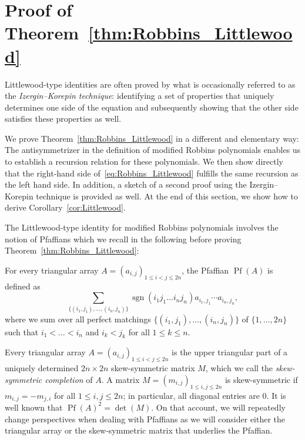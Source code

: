\documentclass[ALCO, Unicode]{cedram}
\DeclareMathOperator{\sgn}{sgn}
\DeclareMathOperator*{\pf}{Pf}
\begin{document}
	
	\section{Proof of Theorem~\ref{thm:Robbins_Littlewood}}
	\label{sec:mainproof}
	
	Littlewood-type identities are often proved by what is occasionally referred to as the \emph{Izergin--Korepin technique}: identifying a set of properties that uniquely determines one side of the equation and subsequently showing that the other side satisfies these properties as well.
	
	We prove Theorem~\ref{thm:Robbins_Littlewood} in a different and elementary way:  The antisymmetrizer in the definition of modified Robbins polynomials enables us to establish a recursion relation for these polynomials. We then show directly that the right-hand side of~\eqref{eq:Robbins_Littlewood} fulfills the same recursion as the left hand side. In addition, a sketch of a second proof using the Izergin--Korepin technique is provided as well. At the end of this section, we show how to derive Corollary~\ref{cor:Littlewood}.
	
	The Littlewood-type identity for modified Robbins polynomials  involves the notion of Pfaffians which we recall in the following before proving Theorem~\ref{thm:Robbins_Littlewood}:
	
	For every triangular array $A=(a_{i,j})_{1 \le i < j \le 2n}$, the Pfaffian $\pf(A)$ is defined as
	\begin{equation*}
		\sum_{\{(i_1,j_1),\dots,(i_n,j_n)\}} \sgn(i_1 j_1 \dots i_n j_n) a_{i_1,j_1} \cdots a_{i_n,j_n},
	\end{equation*}
	where we sum over all perfect matchings $\{(i_1,j_1),\dots,(i_n,j_n)\}$ of $\{1,\dots,2n\}$ such that $i_1 < \dots < i_n$ and $i_k < j_k$ for all $1 \le k \le n$.
	
	Every triangular array $A=(a_{i,j})_{1 \le i < j \le 2n}$ is the upper triangular part of a uniquely determined $2n \times 2n$ skew-symmetric matrix $M$, which we call the \emph{skew-symmetric completion} of $A$. A matrix $M=(m_{i,j})_{1 \le i , j \le 2n}$ is skew-symmetric if $m_{i,j} = - m_{j,i}$ for all $1 \le i,j \le 2n$; in particular, all diagonal entries are $0$. It is well known that $\pf(A)^2=\det(M)$. On that account, we will repeatedly change perspectives when dealing with Pfaffians as we will consider either the triangular array or the skew-symmetric matrix that underlies the Pfaffian.
	
\end{document}
